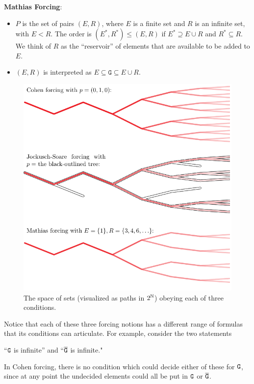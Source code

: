 \documentclass{amsart}
\begin{document}
	\textbf{Mathias Forcing}: 
	\begin{itemize}
		\item $P$ is the set of pairs $(E,R)$, where $E$ is a finite set and $R$ is an infinite set, with $E<R$. The order is $(E^*,R^*)\leq (E,R)$ if $E^*\supseteq E\cup R$ and $R^*\subseteq R$. We think of $R$ as the ``reservoir'' of elements that are available to be added to $E$.
		\item $(E,R)$ is interpreted as $E\subseteq  \mathtt{G}\subseteq E\cup R$.
	\end{itemize} 
	
	\begin{figure}[h]
		\includegraphics{Figures/ForcingComparison.pdf}
		\caption{The space of sets (visualized as paths in $2^{\mathbb{N}}$) obeying each of three conditions.}
	\end{figure}
	
	Notice that each of these three forcing notions has a different range of formulas that its conditions can articulate. For example, consider the two statements 
	\begin{center}``$\tt{G}$ is infinite'' and ``$\overline{\tt{G}}$ is infinite."\end{center}
	
	In Cohen forcing, there is no condition which could decide either of these for $\tt{G}$, since at any point the undecided elements could all be put in $\tt{G}$ or $\overline{\tt{G}}$. 
	
\end{document}
